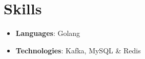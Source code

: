 \documentclass[letterpaper,11pt]{article}
\newcommand{\resumeItem}[2]{
  \item\small{
    \textbf{#1}{: #2 \vspace{-2pt}}
  }
}
\newcommand{\resumeSubItem}[2]{\resumeItem{#1}{#2}\vspace{-4pt}}
\newcommand{\resumeSubHeadingListStart}{\begin{itemize}[leftmargin=*]}
\newcommand{\resumeSubHeadingListEnd}{\end{itemize}}
\begin{document}

%
\section{Skills}
 \resumeSubHeadingListStart
    \resumeSubItem{Languages}{Golang}
    \resumeSubItem{Technologies}{Kafka, MySQL \& Redis}
 \resumeSubHeadingListEnd


\end{document}
